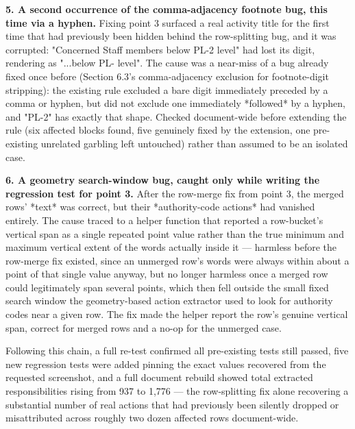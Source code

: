 \textbf{5. A second occurrence of the comma-adjacency footnote bug, this time via a hyphen.} Fixing point 3 surfaced a real activity title for the first time that had previously been hidden behind the row-splitting bug, and it was corrupted: "Concerned Staff members below PL-2 level" had lost its digit, rendering as "...below PL- level". The cause was a near-miss of a bug already fixed once before (Section 6.3's comma-adjacency exclusion for footnote-digit stripping): the existing rule excluded a bare digit immediately preceded by a comma or hyphen, but did not exclude one immediately *followed* by a hyphen, and "PL-2" has exactly that shape. Checked document-wide before extending the rule (six affected blocks found, five genuinely fixed by the extension, one pre-existing unrelated garbling left untouched) rather than assumed to be an isolated case.

\textbf{6. A geometry search-window bug, caught only while writing the regression test for point 3.} After the row-merge fix from point 3, the merged rows' *text* was correct, but their *authority-code actions* had vanished entirely. The cause traced to a helper function that reported a row-bucket's vertical span as a single repeated point value rather than the true minimum and maximum vertical extent of the words actually inside it — harmless before the row-merge fix existed, since an unmerged row's words were always within about a point of that single value anyway, but no longer harmless once a merged row could legitimately span several points, which then fell outside the small fixed search window the geometry-based action extractor used to look for authority codes near a given row. The fix made the helper report the row's genuine vertical span, correct for merged rows and a no-op for the unmerged case.

Following this chain, a full re-test confirmed all pre-existing tests still passed, five new regression tests were added pinning the exact values recovered from the requested screenshot, and a full document rebuild showed total extracted responsibilities rising from 937 to 1,776 — the row-splitting fix alone recovering a substantial number of real actions that had previously been silently dropped or misattributed across roughly two dozen affected rows document-wide.

